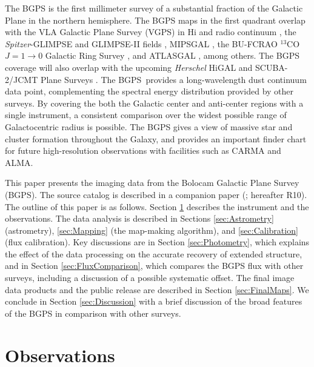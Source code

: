 \documentclass[12pt,preprint]{aastex}
\newcommand\Ros{R10}
\def\bgps{BGPS}
\begin{document}
The BGPS is the first millimeter survey of a substantial fraction of
the Galactic Plane in the northern hemisphere.  The BGPS maps in the
first quadrant overlap with the VLA Galactic Plane Survey (VGPS) in
H{\sc i} and radio continuum \citep{stil06}, the {\it Spitzer}-GLIMPSE
and GLIMPSE-II fields \citep{benjamin03}, MIPSGAL \citep{carey09}, the
BU-FCRAO $^{13}$CO $J=1 \to 0$ Galactic Ring Survey \citep{jackson06},
and ATLASGAL \citep{schuller09}, among others.  The BGPS coverage will
also overlap with the upcoming {\it Herschel} HiGAL \citep{molinari10}
and SCUBA-2/JCMT Plane Surveys \citep{difrancesco08b}.  The \bgps\
provides a long-wavelength dust continuum data point, complementing
the spectral energy distribution provided by other surveys. By
covering the both the Galactic center and anti-center regions with a
single instrument, a consistent comparison over the widest possible
range of Galactocentric radius is possible.  The BGPS gives a view of
massive star and cluster formation throughout the Galaxy, and provides
an important finder chart for future high-resolution observations with
facilities such as CARMA and ALMA.

This paper presents the imaging data from the Bolocam Galactic Plane
Survey (BGPS).  The source catalog is described in a companion paper
(\citet{rosolowsky10}; hereafter \Ros).  The outline of this paper is
as follows. Section \ref{sec:Observations} describes the instrument
and the observations.  The data analysis is described in Sections
\ref{sec:Astrometry} (astrometry), \ref{sec:Mapping} (the map-making
algorithm), and \ref{sec:Calibration} (flux calibration).  Key
discussions are in Section \ref{sec:Photometry}, which explains the
effect of the data processing on the accurate recovery of extended
structure, and in Section \ref{sec:FluxComparison}, which compares the
BGPS flux with other surveys, including a discussion of a possible
systematic offset.  The final image data products and the public
release are described in Section \ref{sec:FinalMaps}.  We conclude in
Section \ref{sec:Discussion} with a brief discussion of the broad
features of the BGPS in comparison with other surveys.

\section{Observations}
\label{sec:Observations}
\end{document}
